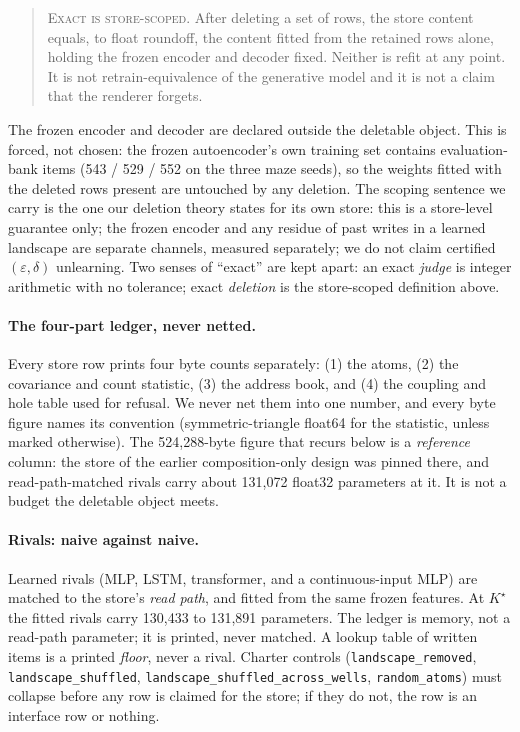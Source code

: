 \documentclass{article} %
\newcommand{\Kstar}{\ensuremath{K^{\star}}}
\begin{document}
\begin{quote}\small
\textsc{Exact is store-scoped.} After deleting a set of rows, the store content equals, to
float roundoff, the content fitted from the retained rows alone, holding the frozen encoder and
decoder fixed. Neither is refit at any point. It is not retrain-equivalence of the generative
model and it is not a claim that the renderer forgets.
\end{quote}

\noindent The frozen encoder and decoder are declared outside the deletable object. This is
forced, not chosen: the frozen autoencoder's own training set contains evaluation-bank items
(543 / 529 / 552 on the three maze seeds), so the weights fitted with the deleted rows present
are untouched by any deletion. %
The scoping sentence we carry is the one our deletion theory states for its own store: this is
a store-level guarantee only; the frozen encoder and any residue of past writes in a learned
landscape are separate channels, measured separately; we do not claim certified
$(\varepsilon,\delta)$ unlearning. %
Two senses of ``exact'' are kept apart: an exact \emph{judge} is integer arithmetic with no
tolerance; exact \emph{deletion} is the store-scoped definition above.

\paragraph{The four-part ledger, never netted.} Every store row prints four byte counts
separately: (1) the atoms, (2) the covariance and count statistic, (3) the address book, and
(4) the coupling and hole table used for refusal. We never net them into one number, and every
byte figure names its convention (symmetric-triangle float64 for the statistic, unless marked
otherwise). The 524,288-byte figure that recurs below is a \emph{reference} column: the store
of the earlier composition-only design was pinned there, and read-path-matched rivals carry
about 131,072 float32 parameters at it. %
It is not a budget the deletable object meets.

\paragraph{Rivals: naive against naive.} Learned rivals (MLP, LSTM, transformer, and a
continuous-input MLP) are matched to the store's \emph{read path}, and fitted from the same
frozen features. At $\Kstar$ the fitted rivals carry 130,433 to 131,891 parameters.
The ledger is memory, not a read-path parameter; it is printed, never matched. A lookup table
of written items is a printed \emph{floor}, never a rival. Charter controls
(\texttt{landscape\_removed}, \texttt{landscape\_shuffled},
\texttt{landscape\_shuffled\_across\_wells}, \texttt{random\_atoms}) must collapse before any
row is claimed for the store; if they do not, the row is an interface row or nothing.
\end{document}
